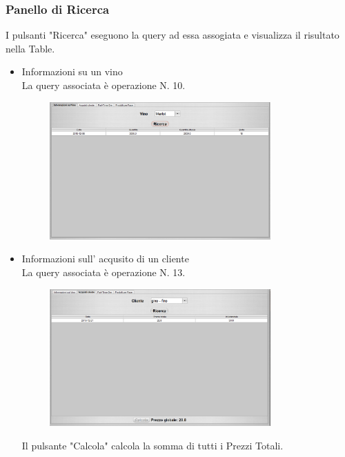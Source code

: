 \documentclass{article}
\begin{document}
\subsubsection{Panello di Ricerca}
I pulsanti "Ricerca"  eseguono la query ad essa assogiata e visualizza il risultato nella Table.\\
\begin{itemize}
\item Informazioni su un vino \\
La query associata è operazione N. 10.\\
\begin{figure}[htbp]
\centering
\includegraphics[width=0.8\textwidth]{img/panel_info_vino.png}
\end{figure}
\item Informazioni sull' acqusito di un cliente\\
La query associata è operazione N. 13.\\
\begin{figure}[htbp]
\centering
\includegraphics[width=0.8\textwidth]{img/panel_acquisto_cliente.png}
\end{figure}\newline
Il pulsante "Calcola" calcola la somma di tutti i Prezzi Totali.\\

\end{itemize}
\end{document}

